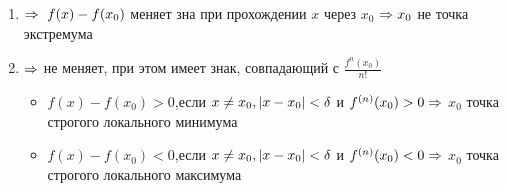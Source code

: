 \begin{proofs}
\begin{dokvo}
	\begin{enumerate}
		\item {} $\Rightarrow \ f(x) - f(x_0)$ меняет зна при прохождении $x$ через $x_0$ $\Rightarrow x_0$ не точка экстремума
		\item {} $\Rightarrow$ не меняет, при этом имеет знак, совпадающий с $\frac{f^{n}(x_0)}{n!}$
		\begin{itemize}
			\item $f(x) - f(x_0)>0$,если $x \neq x_0, \left| x- x_0\right| < \delta$ и $f^{(n)}(x_0)>0 \Rightarrow$ $x_0$ точка строгого локального минимума
			\item $f(x) - f(x_0)<0$,если $x \neq x_0, \left| x- x_0\right| < \delta$ и $f^{(n)}(x_0)<0 \Rightarrow$ $x_0$ точка строгого локального максимума 
		\end{itemize}
	\end{enumerate}
\end{dokvo}
\end{proofs}
\newpage
